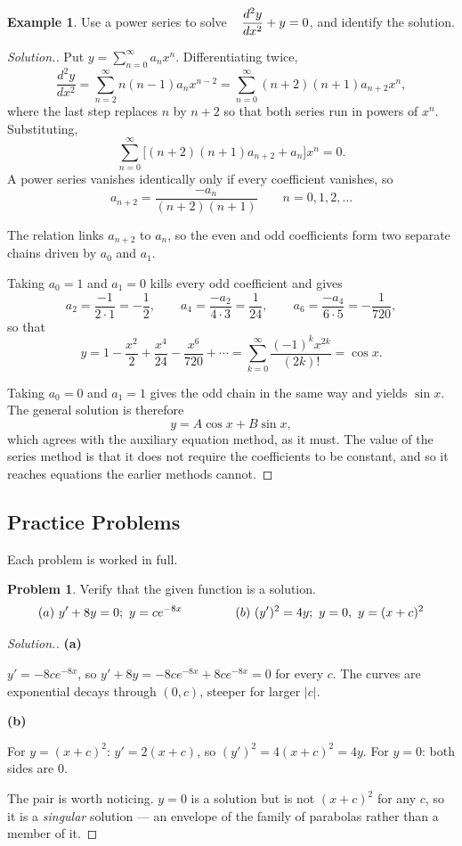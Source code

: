 \documentclass[11pt,a4paper]{article}
\theoremstyle{definition}
\newtheorem{exa}[thm]{Example}
\newtheorem{problemx}{Problem}[subsection]
\newenvironment{problem}{\begin{problemx}}{\end{problemx}}
\newenvironment{solution}
  {\renewcommand{\qedsymbol}{}\begin{proof}[\textit{Solution}.]}
  {\end{proof}}
\newcommand{\subhead}[1]{%
  \par\medskip\noindent\textbf{#1}\par\nobreak\smallskip}
\begin{document}
\begin{exa}
Use a power series to solve $\hspace{0.3cm}\dfrac{d^2y}{dx^2} + y = 0$, and
identify the solution.
\end{exa}

\begin{solution}
Put $\displaystyle{y = \sum_{n=0}^{\infty}a_nx^n}$. Differentiating twice,
$$\frac{d^2y}{dx^2} = \sum_{n=2}^{\infty}n(n-1)a_nx^{n-2}
= \sum_{n=0}^{\infty}(n+2)(n+1)a_{n+2}x^{n},$$
where the last step replaces $n$ by $n+2$ so that both series run in powers of
$x^n$. Substituting,
$$\sum_{n=0}^{\infty}\Big[(n+2)(n+1)a_{n+2} + a_n\Big]x^n = 0 .$$
A power series vanishes identically only if every coefficient vanishes, so
$$\boxed{a_{n+2} = \frac{-a_n}{(n+2)(n+1)}}\qquad n = 0,1,2,\dots$$

The relation links $a_{n+2}$ to $a_n$, so the even and odd coefficients form two
separate chains driven by $a_0$ and $a_1$.

Taking $a_0 = 1$ and $a_1 = 0$ kills every odd coefficient and gives
$$a_2 = \frac{-1}{2\cdot 1} = -\frac{1}{2},\qquad
a_4 = \frac{-a_2}{4\cdot 3} = \frac{1}{24},\qquad
a_6 = \frac{-a_4}{6\cdot 5} = -\frac{1}{720},$$
so that
$$y = 1 - \frac{x^2}{2} + \frac{x^4}{24} - \frac{x^6}{720} + \cdots
= \sum_{k=0}^{\infty}\frac{(-1)^kx^{2k}}{(2k)!} = \cos x .$$

Taking $a_0 = 0$ and $a_1 = 1$ gives the odd chain in the same way and yields
$\sin x$. The general solution is therefore
$$y = A\cos x + B\sin x ,$$
which agrees with the auxiliary equation method, as it must. The value of the
series method is that it does not require the coefficients to be constant, and
so it reaches equations the earlier methods cannot.
\end{solution}

\subsection{Practice Problems}

Each problem is worked in full.

\begin{problem}
Verify that the given function is a solution.
$$(a)\ y'+8y = 0;\ y = ce^{-8x}\hspace{1.5cm}
(b)\ (y')^2 = 4y;\ y = 0,\ y = (x+c)^2$$
\end{problem}
\begin{solution}
\subhead{(a)}
$y' = -8ce^{-8x}$, so $y'+8y = -8ce^{-8x} + 8ce^{-8x} = 0$ for every $c$. The
curves are exponential decays through $(0,c)$, steeper for larger $\left|c\right|$.

\subhead{(b)}
For $y = (x+c)^2$: $y' = 2(x+c)$, so
$(y')^2 = 4(x+c)^2 = 4y$. For $y = 0$: both sides are $0$.

The pair is worth noticing. $y=0$ is a solution but is not $(x+c)^2$ for any
$c$, so it is a \emph{singular} solution --- an envelope of the family of
parabolas rather than a member of it.
\end{solution}
\end{document}
